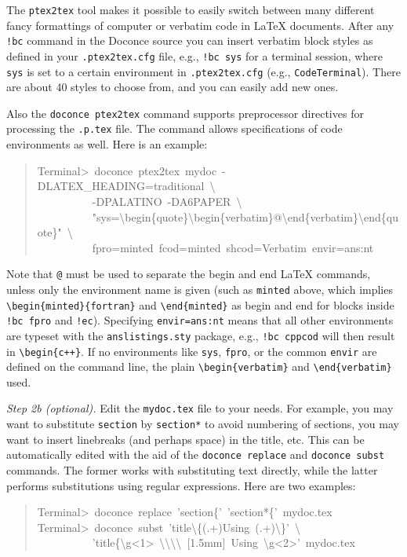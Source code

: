 \documentclass[a4paper]{article}
\begin{document}
The \texttt{ptex2tex} tool makes it possible to easily switch between many
different fancy formattings of computer or verbatim code in LaTeX
documents. After any \texttt{!bc} command in the Doconce source you can
insert verbatim block styles as defined in your \texttt{.ptex2tex.cfg}
file, e.g., \texttt{!bc sys} for a terminal session, where \texttt{sys} is set to
a certain environment in \texttt{.ptex2tex.cfg} (e.g., \texttt{CodeTerminal}).
There are about 40 styles to choose from, and you can easily add
new ones.

Also the \texttt{doconce ptex2tex} command supports preprocessor directives
for processing the \texttt{.p.tex} file. The command allows specifications
of code environments as well. Here is an example:
%
\begin{quote}{\ttfamily \raggedright \noindent
Terminal>~doconce~ptex2tex~mydoc~-DLATEX\_HEADING=traditional~\textbackslash{}\\
~~~~~~~~~~-DPALATINO~-DA6PAPER~\textbackslash{}\\
~~~~~~~~~~"sys=\textbackslash{}begin\{quote\}\textbackslash{}begin\{verbatim\}@\textbackslash{}end\{verbatim\}\textbackslash{}end\{quote\}"~\textbackslash{}\\
~~~~~~~~~~fpro=minted~fcod=minted~shcod=Verbatim~envir=ans:nt
}
\end{quote}

Note that \texttt{@} must be used to separate the begin and end LaTeX
commands, unless only the environment name is given (such as \texttt{minted}
above, which implies \texttt{\textbackslash{}begin\{minted\}\{fortran\}} and \texttt{\textbackslash{}end\{minted\}} as
begin and end for blocks inside \texttt{!bc fpro} and \texttt{!ec}).  Specifying
\texttt{envir=ans:nt} means that all other environments are typeset with the
\texttt{anslistings.sty} package, e.g., \texttt{!bc cppcod} will then result in
\texttt{\textbackslash{}begin\{c++\}}. If no environments like \texttt{sys}, \texttt{fpro}, or the common
\texttt{envir} are defined on the command line, the plain \texttt{\textbackslash{}begin\{verbatim\}}
and \texttt{\textbackslash{}end\{verbatim\}} used.

\emph{Step 2b (optional).} Edit the \texttt{mydoc.tex} file to your needs.
For example, you may want to substitute \texttt{section} by \texttt{section*} to
avoid numbering of sections, you may want to insert linebreaks
(and perhaps space) in the title, etc. This can be automatically
edited with the aid of the \texttt{doconce replace} and \texttt{doconce subst}
commands. The former works with substituting text directly, while the
latter performs substitutions using regular expressions.
Here are two examples:
%
\begin{quote}{\ttfamily \raggedright \noindent
Terminal>~doconce~replace~'section\{'~'section*\{'~mydoc.tex\\
Terminal>~doconce~subst~'title\textbackslash{}\{(.+)Using~(.+)\textbackslash{}\}'~\textbackslash{}\\
~~~~~~~~~~'title\{\textbackslash{}g<1>~\textbackslash{}\textbackslash{}\textbackslash{}\textbackslash{}~{[}1.5mm{]}~Using~\textbackslash{}g<2>'~mydoc.tex
}
\end{quote}
\end{document}
